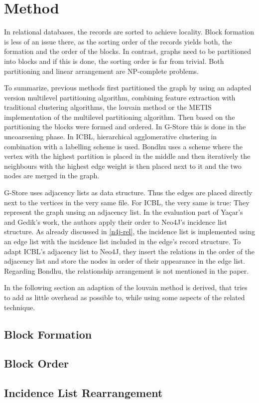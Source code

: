 \chapter{Method}\label{\positionnumber}
    In relational databases, the records are sorted to achieve locality. 
    Block formation is less of an issue there, as the sorting order of the records yields both, the formation and the order of the blocks.
    In contrast, graphs need to be partitioned into blocks and if this is done, the sorting order is far from trivial.
    Both partitioning and linear arrangement are NP-complete problems.
    
     To summarize, previous methods first partitioned the graph by using an adapted version multilevel partitioning algorithm, combining feature extraction with traditional clustering algorithms, the louvain method or the METIS implementation of the multilevel partitioning algorithm.
    Then based on the partitioning the blocks were formed and ordered.
    In G-Store this is done in the uncoarsening phase.
    In ICBL, hierarchical agglomerative clustering in combination with a labelling scheme is used.
    Bondhu uses a scheme where the vertex with the highest partition is placed in the middle and then iteratively the neighbours with the highest edge weight is then placed next to it and the two nodes are merged in the graph. 
    
    G-Store uses adjacency lists as data structure.
    Thus the edges are placed directly next to the vertices in the very same file.
    For ICBL, the very same is true:
    They represent the graph unsing an adjacency list. 
    In the evaluation part of Ya\c{c}ar's and Gedik's work, the authors apply their order to Neo4J's incidence list structure. 
    As already discussed in \ref{n4j-rel}, the incidence list is implemented using an edge list with the incidence list included in the edge's record structure.
    To adapt ICBL's adjacency list to Neo4J, they insert the relations in the order of the adjacency list and store the nodes in order of their appearance in the edge list.    
    Regarding Bondhu, the relationship arrangement is not mentioned in the paper.
    
    In the following section an adaption of the louvain method is derived, that tries to add as little overhead as possible to, while using some aspects of the related technique.
    
    \section{Block Formation}
    
    
    \section{Block Order}\label{\positionnumber}
    
    \section{Incidence List Rearrangement}\label{\positionnumber}
